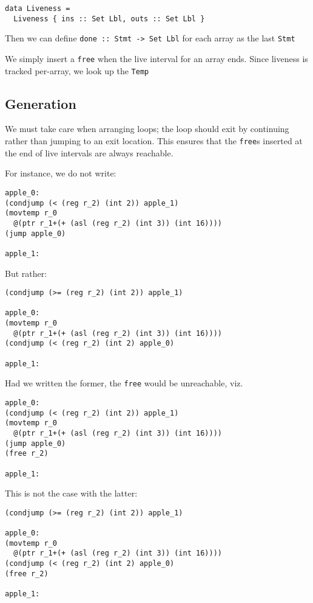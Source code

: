 \documentclass[sigplan,screen,anonymous]{acmart}
\begin{document}
\begin{verbatim}
data Liveness = 
  Liveness { ins :: Set Lbl, outs :: Set Lbl }
\end{verbatim}

Then we can define {\tt done :: Stmt -> Set Lbl} for each array as the last {\tt Stmt}

We simply insert a {\tt free} when the live interval for an array ends. Since liveness is tracked per-array, we look up the {\tt Temp}

\subsection{Generation}

We must take care when arranging loops; the loop should exit by continuing rather than jumping to an exit location. This ensures that the {\tt free}s inserted at the end of live intervals are always reachable.

For instance, we do not write:

\begin{verbatim}
apple_0:
(condjump (< (reg r_2) (int 2)) apple_1)
(movtemp r_0 
  @(ptr r_1+(+ (asl (reg r_2) (int 3)) (int 16))))
(jump apple_0)

apple_1:
\end{verbatim}

But rather:

\begin{verbatim}
(condjump (>= (reg r_2) (int 2)) apple_1)

apple_0:
(movtemp r_0 
  @(ptr r_1+(+ (asl (reg r_2) (int 3)) (int 16))))
(condjump (< (reg r_2) (int 2) apple_0)

apple_1:
\end{verbatim}

Had we written the former, the {\tt free} would be unreachable, viz.

\begin{verbatim}
apple_0:
(condjump (< (reg r_2) (int 2)) apple_1)
(movtemp r_0 
  @(ptr r_1+(+ (asl (reg r_2) (int 3)) (int 16))))
(jump apple_0)
(free r_2)

apple_1:
\end{verbatim}

This is not the case with the latter:

\begin{verbatim}
(condjump (>= (reg r_2) (int 2)) apple_1)

apple_0:
(movtemp r_0 
  @(ptr r_1+(+ (asl (reg r_2) (int 3)) (int 16))))
(condjump (< (reg r_2) (int 2) apple_0)
(free r_2)

apple_1:
\end{verbatim}
\end{document}

